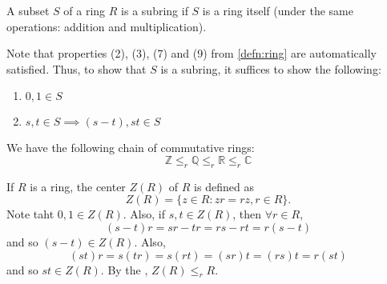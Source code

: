 \begin{defn}[Subring]
\label{defn:subring}
A subset $S$ of a ring $R$ is a subring if $S$ is a ring itself (under the same operations: addition and multiplication).
\end{defn}

Note that properties (2), (3), (7) and (9) from \cref{defn:ring} are automatically satisfied. Thus, to show that $S$ is a subring, it suffices to show the following:

\label{spe:subring_test}
\begin{enumerate}
  \item $0, 1 \in S$
  \item $s, t \in S \implies ( s - t ), st \in S$
\end{enumerate}

\begin{eg}
  We have the following chain of commutative rings:
  \begin{equation*}
    \mathbb{Z} \leq_r \mathbb{Q} \leq_r \mathbb{R} \leq_r \mathbb{C}
  \end{equation*}
\end{eg}

\begin{eg}
  If $R$ is a ring, the \textcolor{base16-eighties-blue}{center} $Z(R)$ of $R$ is defined as
  \begin{equation*}
    Z(R) = \{ z \in R : zr = rz, r \in R \}.
  \end{equation*}
  Note taht $0, 1 \in Z(R)$. Also, if $s, t \in Z(R)$, then $\forall r \in R$,
  \begin{equation*}
    (s - t) r = sr - tr = rs - rt = r( s - t )
  \end{equation*}
  and so $(s - t) \in Z(R)$. Also,
  \begin{equation*}
    (st)r = s(tr) = s(rt) = (sr)t = (rs)t = r(st)
  \end{equation*}
  and so $st \in Z(R)$. By the , $Z(R) \leq_r R$.
\end{eg}

